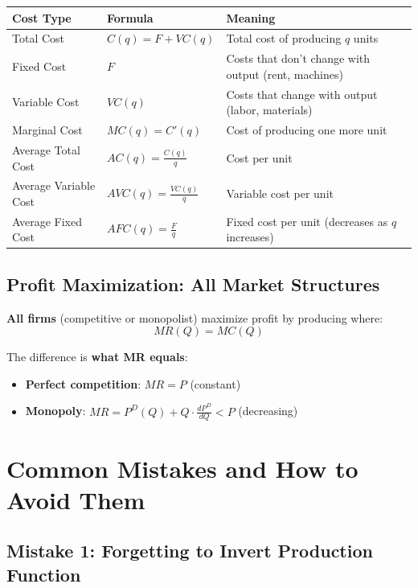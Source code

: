 \documentclass[12pt]{article}
\begin{document}
\begin{center}
\begin{tabular}{|p{3.5cm}|p{4cm}|p{6cm}|}
\hline
\textbf{Cost Type} & \textbf{Formula} & \textbf{Meaning} \\
\hline
\hline
Total Cost & $C(q) = F + VC(q)$ & Total cost of producing $q$ units \\
\hline
Fixed Cost & $F$ & Costs that don't change with output (rent, machines) \\
\hline
Variable Cost & $VC(q)$ & Costs that change with output (labor, materials) \\
\hline
Marginal Cost & $MC(q) = C'(q)$ & Cost of producing one more unit \\
\hline
Average Total Cost & $AC(q) = \frac{C(q)}{q}$ & Cost per unit \\
\hline
Average Variable Cost & $AVC(q) = \frac{VC(q)}{q}$ & Variable cost per unit \\
\hline
Average Fixed Cost & $AFC(q) = \frac{F}{q}$ & Fixed cost per unit (decreases as $q$ increases) \\
\hline
\end{tabular}
\end{center}

\subsection{Profit Maximization: All Market Structures}

\begin{keyidea}
\textbf{All firms} (competitive or monopolist) maximize profit by producing where:
$$MR(Q) = MC(Q)$$

The difference is \textbf{what MR equals}:
\begin{itemize}
\item \textbf{Perfect competition}: $MR = P$ (constant)
\item \textbf{Monopoly}: $MR = P^D(Q) + Q \cdot \frac{dP^D}{dQ} < P$ (decreasing)
\end{itemize}
\end{keyidea}

\newpage

\section{Common Mistakes and How to Avoid Them}

\subsection{Mistake 1: Forgetting to Invert Production Function}
\end{document}

